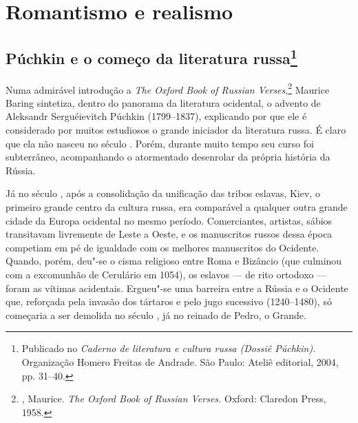 
\part{Romantismo e realismo}

\chapter{Púchkin e o começo da literatura russa\footnote{Publicado no \emph{Caderno de literatura e cultura russa (Dossiê Púchkin)}. Organização Homero Freitas de Andrade. São Paulo: Ateliê editorial, 2004, pp. 31--40.}}

Numa admirável introdução a \emph{The Oxford Book of Russian Verses},\footnote{, Maurice. \emph{The Oxford Book of Russian Verses.} Oxford: Claredon Press, 1958.}
Maurice Baring sintetiza, dentro do panorama da literatura ocidental, o
advento de Aleksandr Serguéievitch Púchkin (1799--1837), explicando por
que ele é considerado por muitos estudiosos o grande iniciador da
literatura russa. É claro que ela não nasceu no século . Porém, durante muito tempo seu curso foi subterrâneo, acompanhando o atormentado
desenrolar da própria história da Rússia.

Já no século , após a consolidação da unificação das tribos eslavas,
Kiev, o primeiro grande centro da cultura russa, era comparável a
qualquer outra grande cidade da Europa ocidental no mesmo período.
Comerciantes, artistas, sábios transitavam livremente de Leste a Oeste,
e os manuscritos russos dessa época competiam em pé de igualdade com os
melhores manuscritos do Ocidente. Quando, porém, deu"-se o cisma
religioso entre Roma e Bizâncio (que culmi­nou com a excomunhão de
Cerulário em 1054), os eslavos --- de rito ortodoxo --- foram as vítimas
acidentais. Ergueu"-se uma barreira entre a Rússia e o Ociden­te que,
reforçada pela invasão dos tártaros e pelo jugo sucessivo (1240--1480),
só começaria a ser demolida no século , já no reinado de
Pedro, o Grande.

